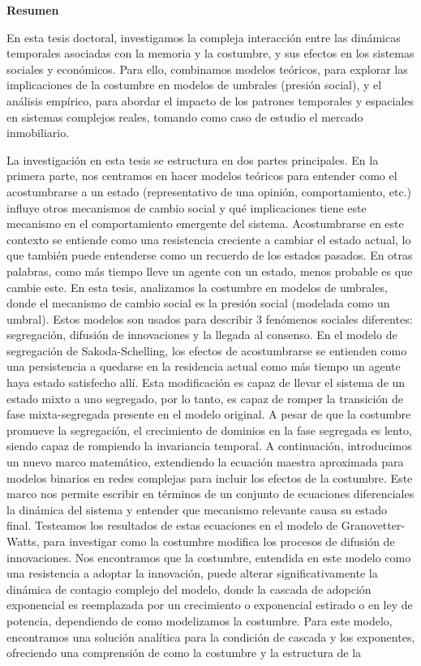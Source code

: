\pagebreak
\thispagestyle{empty}
{}
\textbf{ \huge Resumen}

\vspace*{0.5cm}

En esta tesis doctoral, investigamos la compleja interacción entre las dinámicas temporales asociadas con la memoria y la costumbre, y sus efectos en los sistemas sociales y económicos. Para ello, combinamos modelos teóricos, para explorar las implicaciones de la costumbre en modelos de umbrales (presión social), y el análisis empírico, para abordar el impacto de los patrones temporales y espaciales en sistemas complejos reales, tomando como caso de estudio el mercado inmobiliario.

La investigación en esta tesis se estructura en dos partes principales. En la primera parte, nos centramos en hacer modelos teóricos para entender como el acostumbrarse a un estado (representativo de una opinión, comportamiento, etc.) influye otros mecanismos de cambio social y qué implicaciones tiene este mecanismo en el comportamiento emergente del sistema. Acostumbrarse en este contexto se entiende como una resistencia creciente a cambiar el estado actual, lo que también puede entenderse como un recuerdo de los estados pasados. En otras palabras, como más tiempo lleve un agente con un estado, menos probable es que cambie este. En esta tesis, analizamos la costumbre en modelos de umbrales, donde el mecanismo de cambio social es la presión social (modelada como un umbral). Estos modelos son usados para describir 3 fenómenos sociales diferentes: segregación, difusión de innovaciones y la llegada al consenso. En el modelo de segregación de Sakoda-Schelling, los efectos de acostumbrarse se entienden como una persistencia a quedarse en la residencia actual como más tiempo un agente haya estado satisfecho allí. Esta modificación es capaz de llevar el sistema de un estado mixto a uno segregado, por lo tanto, es capaz de romper la transición de fase mixta-segregada presente en el modelo original. A pesar de que la costumbre promueve la segregación, el crecimiento de dominios en la fase segregada es lento, siendo capaz de rompiendo la invariancia temporal. A continuación, introducimos un nuevo marco matemático, extendiendo la ecuación maestra aproximada para modelos binarios en redes complejas para incluir los efectos de la costumbre. Este marco nos permite escribir en términos de un conjunto de ecuaciones diferenciales la dinámica del sistema y entender que mecanismo relevante causa su estado final. Testeamos los resultados de estas ecuaciones en el modelo de Granovetter-Watts, para investigar como la costumbre modifica los procesos de difusión de innovaciones. Nos encontramos que la costumbre, entendida en este modelo como una resistencia a adoptar la innovación, puede alterar significativamente la dinámica de contagio complejo del modelo, donde la cascada de adopción exponencial es reemplazada por un crecimiento o exponencial estirado o en ley de potencia, dependiendo de como modelizamos la costumbre. Para este modelo, encontramos una solución analítica para la condición de cascada y los exponentes, ofreciendo una comprensión de como la costumbre y la estructura de la 